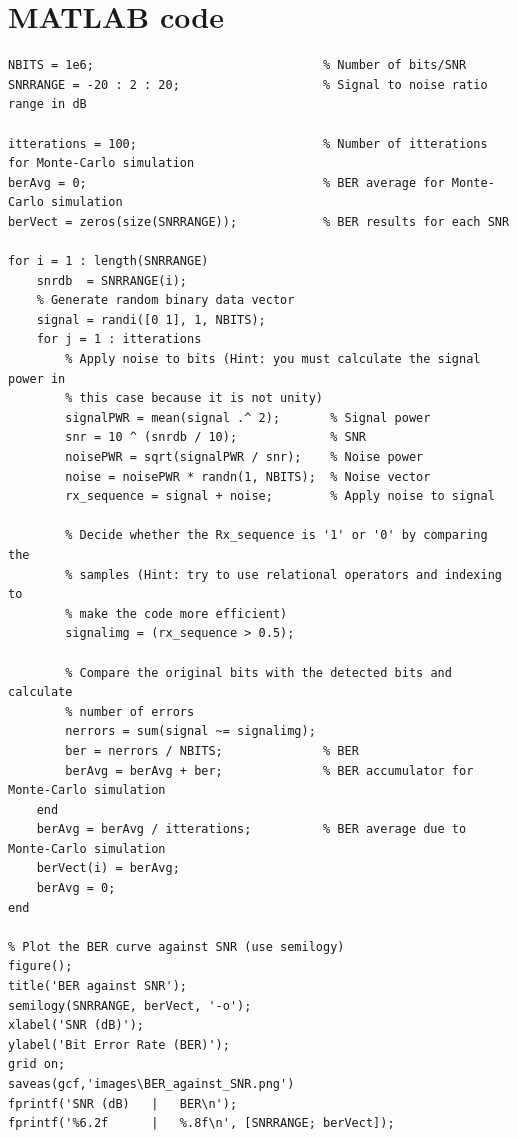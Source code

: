 \documentclass[a4paper, 12pt, english]{article}
\begin{document}
\section{MATLAB code}
\begin{lstlisting}[style=matlab]
% Simulation parameters
NBITS = 1e6;                                % Number of bits/SNR
SNRRANGE = -20 : 2 : 20;                    % Signal to noise ratio range in dB

itterations = 100;                          % Number of itterations for Monte-Carlo simulation
berAvg = 0;                                 % BER average for Monte-Carlo simulation
berVect = zeros(size(SNRRANGE));            % BER results for each SNR

for i = 1 : length(SNRRANGE)
    snrdb  = SNRRANGE(i);
    % Generate random binary data vector
    signal = randi([0 1], 1, NBITS);
    for j = 1 : itterations
        % Apply noise to bits (Hint: you must calculate the signal power in
        % this case because it is not unity)
        signalPWR = mean(signal .^ 2);       % Signal power
        snr = 10 ^ (snrdb / 10);             % SNR
        noisePWR = sqrt(signalPWR / snr);    % Noise power
        noise = noisePWR * randn(1, NBITS);  % Noise vector
        rx_sequence = signal + noise;        % Apply noise to signal
        
        % Decide whether the Rx_sequence is '1' or '0' by comparing the
        % samples (Hint: try to use relational operators and indexing to
        % make the code more efficient)
        signalimg = (rx_sequence > 0.5);
        
        % Compare the original bits with the detected bits and calculate
        % number of errors
        nerrors = sum(signal ~= signalimg);
        ber = nerrors / NBITS;              % BER
        berAvg = berAvg + ber;              % BER accumulator for Monte-Carlo simulation
    end
    berAvg = berAvg / itterations;          % BER average due to Monte-Carlo simulation
    berVect(i) = berAvg;
    berAvg = 0;
end

% Plot the BER curve against SNR (use semilogy)
figure();
title('BER against SNR');
semilogy(SNRRANGE, berVect, '-o');
xlabel('SNR (dB)');
ylabel('Bit Error Rate (BER)');
grid on;
saveas(gcf,'images\BER_against_SNR.png')
fprintf('SNR (dB)	|   BER\n');
fprintf('%6.2f      |   %.8f\n', [SNRRANGE; berVect]);
\end{lstlisting}

\newpage
\end{document}
